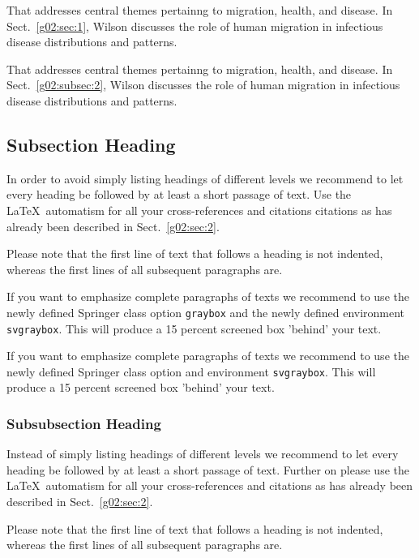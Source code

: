 \begin{description}[Type 1]
\item[Type 1]{That addresses central themes pertainng to migration, health, and disease. In Sect.~\ref{g02:sec:1}, Wilson discusses the role of human migration in infectious disease distributions and patterns.}
\item[Type 2]{That addresses central themes pertainng to migration, health, and disease. In Sect.~\ref{g02:subsec:2}, Wilson discusses the role of human migration in infectious disease distributions and patterns.}
\end{description}

\subsection{Subsection Heading} %
In order to avoid simply listing headings of different levels we recommend to let every heading be followed by at least a short passage of text. Use the \LaTeX\ automatism for all your cross-references and citations citations as has already been described in Sect.~\ref{g02:sec:2}.

Please note that the first line of text that follows a heading is not indented, whereas the first lines of all subsequent paragraphs are.

\begin{svgraybox}
If you want to emphasize complete paragraphs of texts we recommend to use the newly defined Springer class option \verb|graybox| and the newly defined environment \verb|svgraybox|. This will produce a 15 percent screened box 'behind' your text.

If you want to emphasize complete paragraphs of texts we recommend to use the newly defined Springer class option and environment \verb|svgraybox|. This will produce a 15 percent screened box 'behind' your text.
\end{svgraybox}


\subsubsection{Subsubsection Heading}
Instead of simply listing headings of different levels we recommend to let every heading be followed by at least a short passage of text. Further on please use the \LaTeX\ automatism for all your cross-references and citations as has already been described in Sect.~\ref{g02:sec:2}.

Please note that the first line of text that follows a heading is not indented, whereas the first lines of all subsequent paragraphs are.

